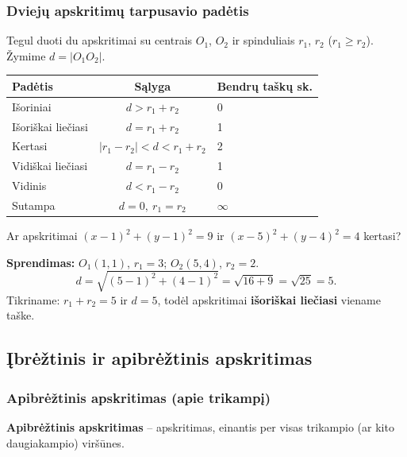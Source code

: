 \subsubsection*{Dviejų apskritimų tarpusavio padėtis}

Tegul duoti du apskritimai su centrais $O_1$, $O_2$ ir spinduliais $r_1$, $r_2$ ($r_1 \geq r_2$). Žymime $d = |O_1 O_2|$.

\begin{center}
\begin{tabular}{|l|c|l|}
\hline
\textbf{Padėtis} & \textbf{Sąlyga} & \textbf{Bendrų taškų sk.} \\
\hline
Išoriniai & $d > r_1 + r_2$ & 0 \\
Išoriškai liečiasi & $d = r_1 + r_2$ & 1 \\
Kertasi & $|r_1 - r_2| < d < r_1 + r_2$ & 2 \\
Vidiškai liečiasi & $d = r_1 - r_2$ & 1 \\
Vidinis & $d < r_1 - r_2$ & 0 \\
Sutampa & $d = 0,\ r_1 = r_2$ & $\infty$ \\
\hline
\end{tabular}
\end{center}

\begin{example}
Ar apskritimai $(x-1)^2 + (y-1)^2 = 9$ ir $(x-5)^2 + (y-4)^2 = 4$ kertasi?

\textbf{Sprendimas:} $O_1(1,1)$, $r_1 = 3$; $O_2(5,4)$, $r_2 = 2$.
\[
d = \sqrt{(5-1)^2 + (4-1)^2} = \sqrt{16 + 9} = \sqrt{25} = 5.
\]
Tikriname: $r_1 + r_2 = 5$ ir $d = 5$, todėl apskritimai \textbf{išoriškai liečiasi} viename taške.
\end{example}

\subsection{Įbrėžtinis ir apibrėžtinis apskritimas}

\subsubsection*{Apibrėžtinis apskritimas (apie trikampį)}

\begin{definition}
\textbf{Apibrėžtinis apskritimas} – apskritimas, einantis per visas trikampio (ar kito daugiakampio) viršūnes.
\end{definition}

